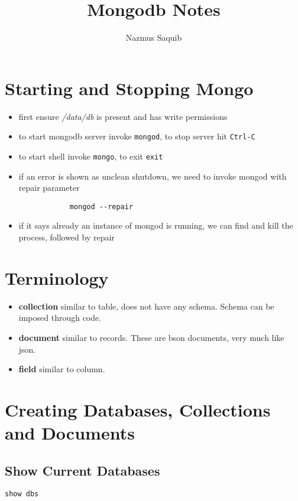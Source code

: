 \documentclass[a4paper, 12pt]{article}
\begin{document}
\title{Mongodb Notes}
\author{Nazmus Saquib}

\maketitle
\tableofcontents

\section{Starting and Stopping Mongo}
\begin{itemize}
    \item first ensure \emph{/data/db} is present and has write permissions
    \item to start mongodb server invoke \verb|mongod|, to stop server hit \verb|Ctrl-C|
    \item to start shell invoke \verb|mongo|, to exit \verb|exit|
    \item if an error is shown as unclean shutdown, we need to invoke mongod with repair parameter
        \begin{verbatim}
            mongod --repair
        \end{verbatim}
    \item if it says already an instance of mongod is running, we can find and kill the process, followed by repair
\end{itemize}

\section{Terminology}
\begin{itemize}
    \item \textbf{collection} similar to table, does not have any schema. Schema can be imposed through code.
    \item \textbf{document} similar to records. These are bson documents, very much like json.
    \item \textbf{field} similar to column.
\end{itemize}

\section{Creating Databases, Collections and Documents}
\subsection{Show Current Databases}
\begin{verbatim}
show dbs
\end{verbatim}
\end{document}

